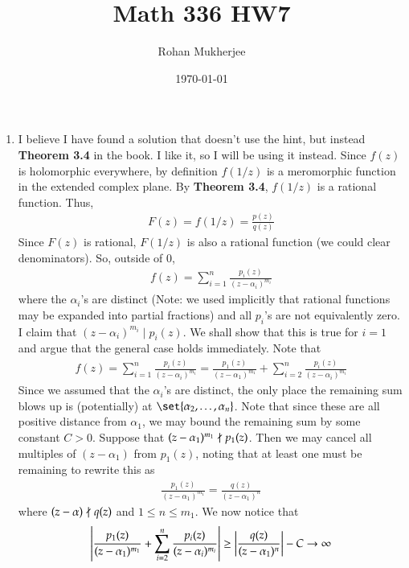 \documentclass[12pt]{article}
\title{Math 336 HW7}
\date{\today}
\author{Rohan Mukherjee}
\theoremstyle{definitionstyle}
\begin{document}
	\maketitle
	\begin{enumerate}[leftmargin=\labelsep]
		\item I believe I have found a solution that doesn't use the hint, but instead \textbf{Theorem 3.4} in the book. I like it, so I will be using it instead. Since $f(z)$ is holomorphic everywhere, by definition $f(1/z)$ is a meromorphic function in the extended complex plane. By \textbf{Theorem 3.4}, $f(1/z)$ is a rational function. Thus, 
		\begin{align*}
			F(z) = f(1/z) = \frac{p(z)}{q(z)}
		\end{align*}
		Since $F(z)$ is rational, $F(1/z)$ is also a rational function (we could clear denominators). So, outside of 0, 
		\begin{align*}
			f(z) = \sum_{i=1}^n \frac{p_i(z)}{(z-\alpha_i)^{m_i}}
		\end{align*}
		where the $\alpha_i$'s are distinct (Note: we used implicitly that rational functions may be expanded into partial fractions) and all $p_i$'s are not equivalently zero. I claim that $(z-\alpha_i)^{m_i} \mid p_i(z)$. We shall show that this is true for $i = 1$ and argue that the general case holds immediately. Note that 
		\begin{align*}
			f(z) = \sum_{i=1}^n \frac{p_i(z)}{(z-\alpha_i)^{m_i}} = \frac{p_1(z)}{(z-\alpha_1)^{m_1}} + \sum_{i=2}^n \frac{p_i(z)}{(z-\alpha_i)^{m_i}}
		\end{align*}
		Since we assumed that the $\alpha_i$'s are distinct, the only place the remaining sum blows up is (potentially) at $\set{\alpha_2, \ldots, \alpha_n}$. Note that since these are all positive distance from $\alpha_1$, we may bound the remaining sum by some constant $C > 0$. Suppose that $(z-\alpha_1)^{m_1} \not \mid p_1(z)$. Then we may cancel all multiples of $(z-\alpha_1)$ from $p_1(z)$, noting that at least one must be remaining to rewrite this as
		\begin{align*}
			\frac{p_1(z)}{(z-\alpha_1)^{m_1}} = \frac{q(z)}{(z-\alpha_1)^n}
		\end{align*}
		where $(z-\alpha) \not \mid q(z)$ and $1 \leq n \leq m_1$. We now notice that
		\begin{align*}
			\qty|\frac{p_1(z)}{(z-\alpha_1)^{m_1}} + \sum_{i=2}^n \frac{p_i(z)}{(z-\alpha_i)^{m_i}}| \geq \qty|\frac{q(z)}{(z-\alpha_1)^n}| - C \to \infty
		\end{align*}

\end{enumerate}
\end{document}

